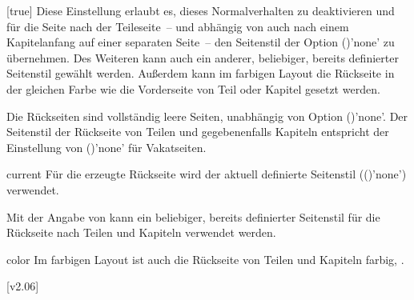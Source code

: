 \begin{Declaration*}{}
\begin{Declaration*}{}
\begin{Declaration*}{}
\begin{Declaration}{}[true]
Diese Einstellung erlaubt es, dieses Normalverhalten zu deaktivieren und für 
die Seite nach der Teileseite~-- und abhängig von  
auch nach einem Kapitelanfang auf einer separaten Seite~-- den Seitenstil der 
Option ()'none' zu übernehmen. Des 
Weiteren kann auch ein anderer, beliebiger, bereits definierter Seitenstil 
gewählt werden. Außerdem kann im farbigen Layout die Rückseite in der gleichen 
Farbe wie die Vorderseite von Teil oder Kapitel gesetzt werden. \notudscrartcl
%
\begin{values}{}
\itemfalse
  Die Rückseiten sind vollständig leere Seiten, unabhängig von Option
  ()'none'.
\itemtrue*
  Der Seitenstil der Rückseite von Teilen und gegebenenfalls Kapiteln entspricht
  der Einstellung von ()'none' für 
  Vakatseiten.
\item[current]
  Für die erzeugte Rückseite wird der aktuell definierte Seitenstil 
  (()'none') verwendet.
\item[\PValueName{Seitenstil}]
  Mit der Angabe von  
  kann ein beliebiger, bereits definierter Seitenstil für die Rückseite nach 
  Teilen und Kapiteln verwendet werden.
\item[color]
  Im farbigen Layout ist auch die Rückseite von Teilen und Kapiteln farbig, 
  .
\end{values}
[v2.06]
\end{Declaration}


\end{Declaration*}
\end{Declaration*}
\end{Declaration*}

